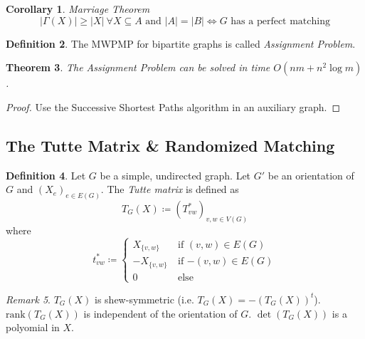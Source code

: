 \documentclass[11pt, a4paper]{article}
\newcommand{\abs}[1]{\left\lvert#1\right\rvert}
\newtheorem{theorem}{Theorem}[section]
\newtheorem{cor}[theorem]{Corollary}
\theoremstyle{remark}
\newtheorem{remark}[theorem]{Remark}
\theoremstyle{definition}
\newtheorem{definition}[theorem]{Definition}
\begin{document}
\begin{cor}{Marriage Theorem}
	\[
		\abs{\Gamma(X)}\geq\abs{X}\ \forall X\subseteq A\text{ and }
		\abs{A}=\abs{B} \Leftrightarrow G \text{ has a perfect matching}
	\]
\end{cor}

\begin{definition}
	The MWPMP for bipartite graphs is called \emph{Assignment Problem}.
\end{definition}

\begin{theorem}
	The Assignment Problem can be solved in time $O(nm+n^2\log m)$.
\end{theorem}
\begin{proof}
	Use the Successive Shortest Paths algorithm in an auxiliary graph.
\end{proof}


\subsection{The Tutte Matrix \& Randomized Matching}

\begin{definition}
	Let $G$ be a simple, undirected graph. Let $G'$ be an orientation
	of $G$ and $(X_e)_{e\in E(G)}$. The \emph{Tutte matrix} is defined as
	\[T_G(X)\coloneqq (T^*_{vw})_{v,w\in V(G)}\]
	where
	\[
		t^*_{vw}\coloneqq \begin{cases}
			X_{\{v,w\}} \quad&\text{if $(v,w)\in E(G)$} \\
			-X_{\{v,w\}} &\text{if $-(v,w)\in E(G)$} \\
			0 &\text{else}
		\end{cases}
	\]
\end{definition}

\begin{remark}
	$T_G(X)$ is shew-symmetric (i.e. $T_G(X)=-(T_G(X))^t$).
	$\mathrm{rank}(T_G(X))$ is independent of the orientation of $G$.
	$\det(T_G(X))$ is a polyomial in $X$.
\end{remark}
\end{document}

